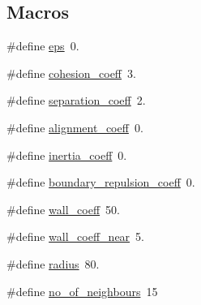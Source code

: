\subsection*{Macros}
\begin{DoxyCompactItemize}
\item 
\#define \hyperlink{_parametric_2_starling-_simulation_2src_2properties_8cpp_ab53328405fd9ba89990d9426d0e6389e}{eps}~0.
\item 
\#define \hyperlink{_parametric_2_starling-_simulation_2src_2properties_8cpp_ab16f7f055bbbd643b9510d1bd42eb4dc}{cohesion\+\_\+coeff}~3.
\item 
\#define \hyperlink{_parametric_2_starling-_simulation_2src_2properties_8cpp_a7f599c3f3ac600fcccbd330b534e48ae}{separation\+\_\+coeff}~2.
\item 
\#define \hyperlink{_parametric_2_starling-_simulation_2src_2properties_8cpp_a9439746dd157dbb69b93e084d1edfb01}{alignment\+\_\+coeff}~0.
\item 
\#define \hyperlink{_parametric_2_starling-_simulation_2src_2properties_8cpp_aada98d3e75b15aaf71743634702209b2}{inertia\+\_\+coeff}~0.
\item 
\#define \hyperlink{_parametric_2_starling-_simulation_2src_2properties_8cpp_a77da7eab1cc4cbb2c82f162c70fbc5c6}{boundary\+\_\+repulsion\+\_\+coeff}~0.
\item 
\#define \hyperlink{_parametric_2_starling-_simulation_2src_2properties_8cpp_ae3ae4055677d82207f6578facdb0fc9f}{wall\+\_\+coeff}~50.
\item 
\#define \hyperlink{_parametric_2_starling-_simulation_2src_2properties_8cpp_aa1f49d89b055225bac6ab75db254c1b3}{wall\+\_\+coeff\+\_\+near}~5.
\item 
\#define \hyperlink{_parametric_2_starling-_simulation_2src_2properties_8cpp_a77e76b711036e5e2fcea28729e200658}{radius}~80.
\item 
\#define \hyperlink{_parametric_2_starling-_simulation_2src_2properties_8cpp_ae3a4f0027a70e328f9ed18819cb867c7}{no\+\_\+of\+\_\+neighbours}~15
\end{DoxyCompactItemize}
